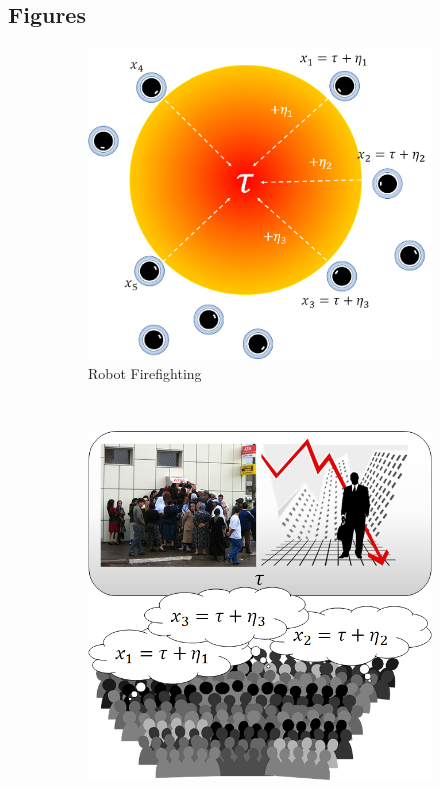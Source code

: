 \documentclass[12pt]{article}
\begin{document}


\newpage
\subsection*{Figures}
\begin{figure}[ht!]
    \centering\begin{subfigure}[t]{0.41\textwidth}
        \centering
        \includegraphics[width=1\textwidth]{figures/firefighting.png}
        \caption{Robot Firefighting}
    \end{subfigure}%
    ~ 
    \begin{subfigure}[t]{0.41\textwidth}
        \centering
        \includegraphics[width=1\textwidth]{figures/bankrun.png}

\end{subfigure}
\end{figure}
\end{document}
